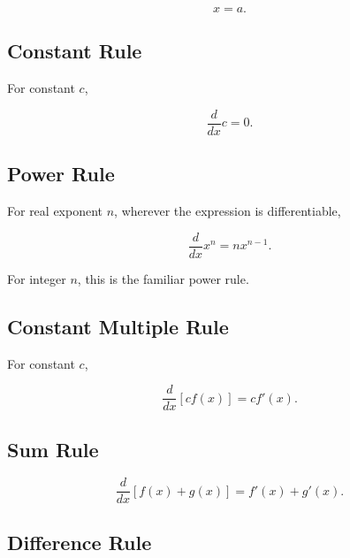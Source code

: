 \[
x=a.
\]

\subsection{Constant Rule}
\label{subsec:constant-derivative-rule}

For constant \(c\),

\[
\boxed{
\frac{d}{dx}c
=
0.
}
\]

\subsection{Power Rule}
\label{subsec:power-derivative-rule}

For real exponent \(n\), wherever the expression is differentiable,

\[
\boxed{
\frac{d}{dx}x^n
=
nx^{n-1}.
}
\]

For integer \(n\), this is the familiar power rule.

\subsection{Constant Multiple Rule}
\label{subsec:constant-multiple-derivative-rule}

For constant \(c\),

\[
\boxed{
\frac{d}{dx}
[c f(x)]
=
c f'(x).
}
\]

\subsection{Sum Rule}
\label{subsec:sum-derivative-rule}

\[
\boxed{
\frac{d}{dx}
[f(x)+g(x)]
=
f'(x)+g'(x).
}
\]

\subsection{Difference Rule}
\label{subsec:difference-derivative-rule}


